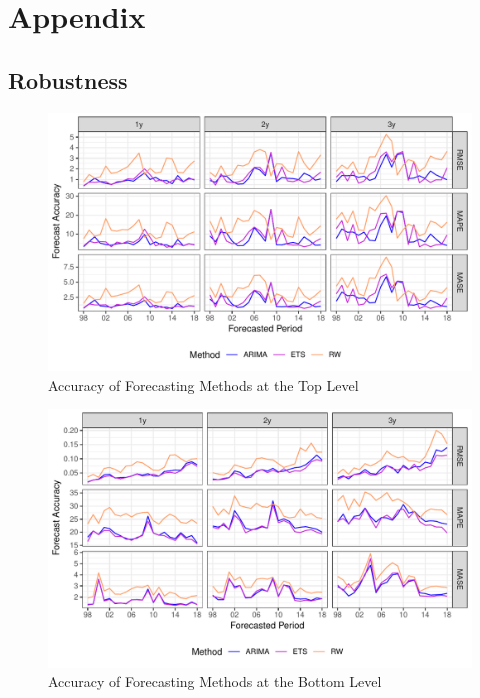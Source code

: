 
\appendix
\section{Appendix}


\subsection{Robustness}
\label{sec:robust}

\begin{figure}[H]
	\includegraphics[width=\textwidth]{fig/fig_eval_methods_top}
	\caption{Accuracy of Forecasting Methods at the Top Level}
\end{figure}
\begin{figure}[H]
	\includegraphics[width=\textwidth]{fig/fig_eval_methods_bottom}
	\caption{Accuracy of Forecasting Methods at the Bottom Level}
\end{figure}
